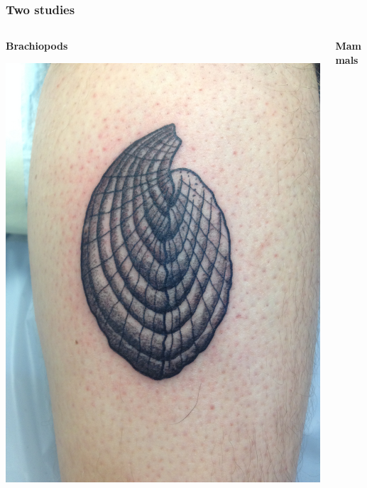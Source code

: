 \documentclass{beamer}
\begin{document}
\begin{frame}
  \frametitle{Two studies}

  \begin{columns}
    \begin{column}{0.5\textwidth}
      \begin{center}
        \textbf{Brachiopods}

        \vspace{0.5cm}

        \includegraphics[height = 0.5\textheight, keepaspectratio = true]{figure/tattoo}
      \end{center}
    \end{column}
    \begin{column}{0.5\textwidth}
      \begin{center}
        \textbf{Mammals}

        \vspace{0.5cm}


\end{center}
\end{column}
\end{columns}
\end{frame}
\end{document}

